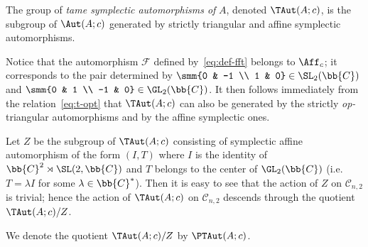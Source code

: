 \begin{definition}
\label{def:TAut}
The group of \textit{tame symplectic automorphisms of} \(A\), denoted \(\TAut(A;c)\), is the subgroup of
\(\Aut(A;c)\) generated by strictly triangular and af\/f\/ine symplectic automorphisms.
\end{definition}

Notice that the automorphism \(\mathcal{F}\) def\/ined by~\eqref{eq:def-fft} belongs to \(\Aff_{c}\); it
corresponds to the pair determined by \(\smm{0 & -1
\\
1 & 0}\in \SL_{2}(\bb{C})\) and \(\smm{0 & 1
\\
-1 & 0}\in \GL_{2}(\bb{C})\).
It then follows immediately from the relation~\eqref{eq:t-opt} that \(\TAut(A;c)\) can also be generated by
the strictly \emph{op-}triangular automorphisms and by the af\/f\/ine symplectic ones.

Let \(Z\) be the subgroup of \(\TAut(A;c)\) consisting of symplectic af\/f\/ine automorphism of the form
\((I,T)\) where \(I\) is the identity of \(\bb{C}^{2}\rtimes \SL(2,\bb{C})\) and \(T\) belongs to the
center of \(\GL_{2}(\bb{C})\) (i.e.\
\(T = \lambda I\) for some \(\lambda\in \bb{C}^{*}\)).
Then it is easy to see that the action of \(Z\) on \(\mathcal{C}_{n,2}\) is trivial; hence the action of
\(\TAut(A;c)\) on \(\mathcal{C}_{n,2}\) descends through the quotient \(\TAut(A;c)/Z\).

\begin{definition}
\label{def:PTAut}
We denote the quotient \(\TAut(A;c)/Z\) by \(\PTAut(A;c)\).
\end{definition}

